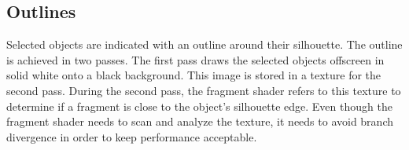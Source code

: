 \documentclass[10pt]{article}
\begin{document}
\subsection{Outlines}

Selected objects are indicated with an outline around their silhouette. The outline is achieved in two passes. The first pass draws the selected objects offscreen in solid white onto a black background. This image is stored in a texture for the second pass. During the second pass, the fragment shader refers to this texture to determine if a fragment is close to the object's silhouette edge. Even though the fragment shader needs to scan and analyze the texture, it needs to avoid branch divergence in order to keep performance acceptable.
\end{document}

